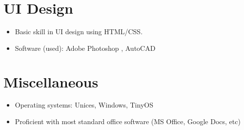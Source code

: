 \documentclass[margin]{res}
\begin{document}
\begin{resume}
\begin{itemize}
\begin{itemize}
                 	\end{itemize}
                 \end{itemize}
\normalsize{\section{UI Design}} 
                 \begin{itemize}
                  \item Basic skill in UI design using HTML/CSS.
                  \item Software (used): Adobe Photoshop , AutoCAD  
                  \end{itemize}

\normalsize{\section{Miscellaneous}}
	           \begin{itemize} 
                   \item Operating systems: Unices, Windows, TinyOS
                   \item Proficient with most standard office software (MS Office, Google Docs, etc)
                   \end{itemize}
                  

\end{resume}
\end{document}
